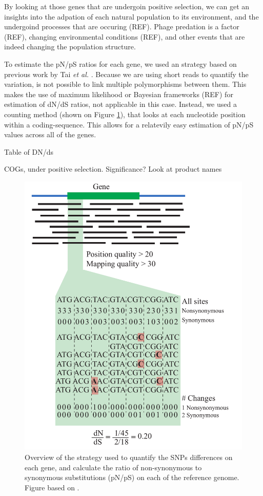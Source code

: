 By looking at those genes that are undergoin positive selection, we can get an insights into the adpation of each natural population to its environment, and the undergoind processes that are occuring (REF). Phage predation is a factor (REF), changing environmental conditions (REF), and other events that are indeed changing the population structure.

To estimate the pN/pS ratios for each gene, we used an strategy based on previous work by Tai \textit{et al.} \cite{Tai:2011jo}. Because we are using short reads to quantify the variation, is not possible to link multiple polymorphisms between them. This makes the use of maximum likelihood or Bayesian frameworks (REF) for estimation of dN/dS ratios, not applicable in this case. Instead, we used a counting method (shown on Figure \ref{MappingStrategy}), that looks at each nucleotide position within a coding-sequence. This allows for a relatevily easy estimation of pN/pS values across all of the genes.



Table of DN/ds

COGs, under positive selection. Significance?
Look at product names
 





\begin{figure}[!hbtp]
  \centering
  \includegraphics[width=\textwidth]{Chapter5/Figures/MappingStrategy.pdf}
  \caption{Overview of the strategy used to quantify the SNPs differences on each gene, and calculate the ratio of non-synonymous to synonymous substitutions (pN/pS) on each of the reference genome. Figure based on \cite{Tai:2011jo}.}
  \label{MappingStrategy}
\end{figure}

